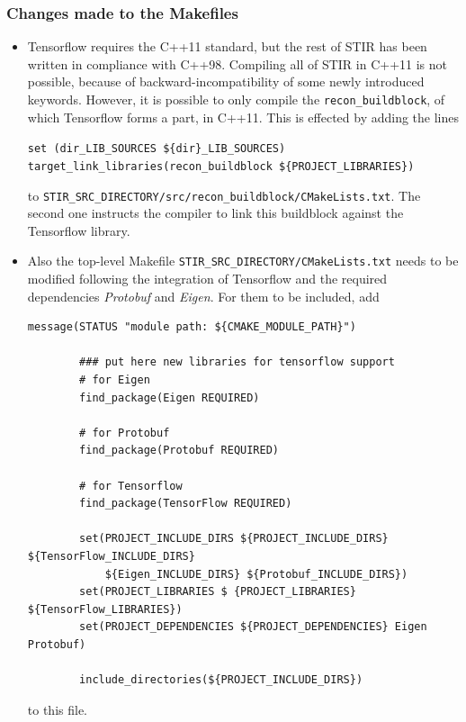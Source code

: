 \documentclass[a4paper, 11pt]{article}
\begin{document}
  \subsubsection{Changes made to the Makefiles}
  \begin{itemize}
    \item Tensorflow requires the C++11 standard, but the rest of STIR has been written in compliance with C++98. Compiling all of STIR in C++11 is not possible, because of backward-incompatibility of some newly introduced keywords. However, it is possible to only compile the \texttt{recon\_buildblock}, of which Tensorflow forms a part, in C++11. This is effected by adding the lines

      \texttt{set (dir\_LIB\_SOURCES \$\{dir\}\_LIB\_SOURCES)\\
      target\_link\_libraries(recon\_buildblock \$\{PROJECT\_LIBRARIES\})}

      to \texttt{STIR\_SRC\_DIRECTORY/src/recon\_buildblock/CMakeLists.txt}. The second one instructs the compiler to link this buildblock against the Tensorflow library.
    \item Also the top-level Makefile \texttt{STIR\_SRC\_DIRECTORY/CMakeLists.txt} needs to be modified following the integration of Tensorflow and the required dependencies \textsl{Protobuf} and \textsl{Eigen}. For them to be included, add
      
      \begin{lstlisting}[basicstyle=\small]
        message(STATUS "module path: ${CMAKE_MODULE_PATH}")
        
        ### put here new libraries for tensorflow support
        # for Eigen
        find_package(Eigen REQUIRED)
        
        # for Protobuf
        find_package(Protobuf REQUIRED)
        
        # for Tensorflow
        find_package(TensorFlow REQUIRED)
        
        set(PROJECT_INCLUDE_DIRS ${PROJECT_INCLUDE_DIRS} ${TensorFlow_INCLUDE_DIRS} 
            ${Eigen_INCLUDE_DIRS} ${Protobuf_INCLUDE_DIRS})
        set(PROJECT_LIBRARIES $ {PROJECT_LIBRARIES} ${TensorFlow_LIBRARIES})
        set(PROJECT_DEPENDENCIES ${PROJECT_DEPENDENCIES} Eigen Protobuf)
        
        include_directories(${PROJECT_INCLUDE_DIRS})
      \end{lstlisting}
      
      to this file.
  \end{itemize}
\end{document}
